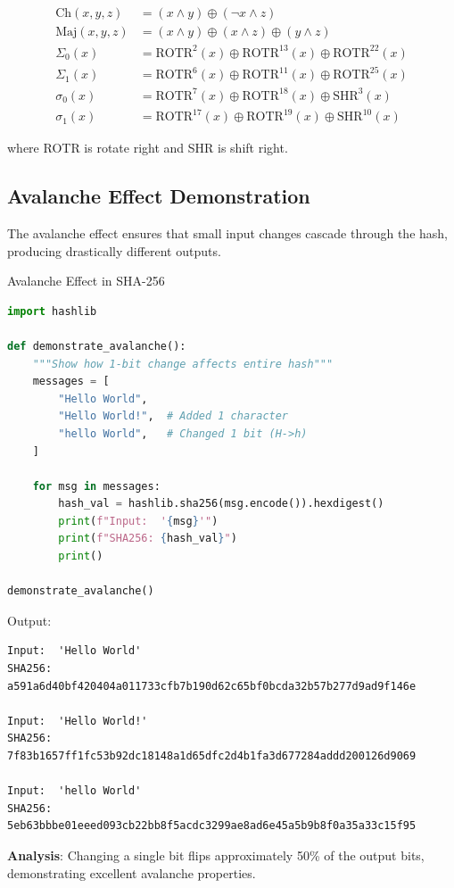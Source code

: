 \documentclass[11pt,a4paper]{article}
\begin{document}
\begin{align*}
\text{Ch}(x, y, z) &= (x \land y) \oplus (\neg x \land z) \\
\text{Maj}(x, y, z) &= (x \land y) \oplus (x \land z) \oplus (y \land z) \\
\Sigma_0(x) &= \text{ROTR}^2(x) \oplus \text{ROTR}^{13}(x) \oplus \text{ROTR}^{22}(x) \\
\Sigma_1(x) &= \text{ROTR}^6(x) \oplus \text{ROTR}^{11}(x) \oplus \text{ROTR}^{25}(x) \\
\sigma_0(x) &= \text{ROTR}^7(x) \oplus \text{ROTR}^{18}(x) \oplus \text{SHR}^3(x) \\
\sigma_1(x) &= \text{ROTR}^{17}(x) \oplus \text{ROTR}^{19}(x) \oplus \text{SHR}^{10}(x)
\end{align*}

where ROTR is rotate right and SHR is shift right.

\subsection{Avalanche Effect Demonstration}

The avalanche effect ensures that small input changes cascade through the hash, producing drastically different outputs.

\begin{examplebox}{Avalanche Effect in SHA-256}
\begin{lstlisting}[language=Python]
import hashlib

def demonstrate_avalanche():
    """Show how 1-bit change affects entire hash"""
    messages = [
        "Hello World",
        "Hello World!",  # Added 1 character
        "hello World",   # Changed 1 bit (H->h)
    ]

    for msg in messages:
        hash_val = hashlib.sha256(msg.encode()).hexdigest()
        print(f"Input:  '{msg}'")
        print(f"SHA256: {hash_val}")
        print()

demonstrate_avalanche()
\end{lstlisting}

Output:
\begin{verbatim}
Input:  'Hello World'
SHA256: a591a6d40bf420404a011733cfb7b190d62c65bf0bcda32b57b277d9ad9f146e

Input:  'Hello World!'
SHA256: 7f83b1657ff1fc53b92dc18148a1d65dfc2d4b1fa3d677284addd200126d9069

Input:  'hello World'
SHA256: 5eb63bbbe01eeed093cb22bb8f5acdc3299ae8ad6e45a5b9b8f0a35a33c15f95
\end{verbatim}

\textbf{Analysis}: Changing a single bit flips approximately 50\% of the output bits, demonstrating excellent avalanche properties.
\end{examplebox}
\end{document}
